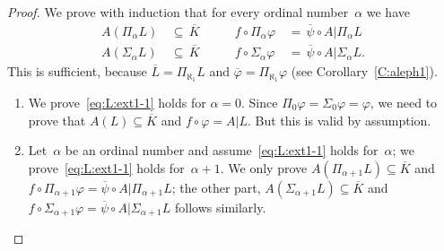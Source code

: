 \begin{proof}
We prove with induction that for every ordinal number~$\alpha$
we have 
\begin{equation}
\label{eq:L:ext1-1}
\begin{alignedat}{3}
A(\Pi_\alpha L)\,&\subseteq\, \overline{K}&
 \qquad f \circ \Pi_\alpha \varphi 
     \,&=\, \overline \psi \circ A | \Pi_\alpha L \\
A(\Sigma_\alpha L)\,&\subseteq\, \overline{K}&
 \qquad f \circ \Sigma_\alpha \varphi 
     \,&=\, \overline \psi \circ A | \Sigma_\alpha L. 
\end{alignedat}
\end{equation}
This is sufficient, because
$\overline{L}=\Pi_{\aleph_1} L$ and 
 $\overline \varphi = \Pi_{\aleph_1} \varphi$
(see Corollary~\ref{C:aleph1}).

\begin{enumerate}
\item We prove~\eqref{eq:L:ext1-1}
holds for $\alpha=0$.
Since $\Pi_0\varphi = \Sigma_0\varphi = \varphi$,
we need to prove that
$A(L)\subseteq \overline{K}$
and $f\circ \varphi = A| L$.
But this is valid by assumption.

\item
Let~$\alpha$ be an ordinal number
and assume~\eqref{eq:L:ext1-1}
holds for~$\alpha$;
we prove~\eqref{eq:L:ext1-1} holds for~$\alpha+1$.
We  only prove $A(\Pi_{\alpha+1} L) \subseteq \overline{K}$
and $f\circ \Pi_{\alpha+1}\varphi = \overline \psi \circ A|\Pi_{\alpha+1} L$;
the other part, $A(\Sigma_{\alpha+1} L) \subseteq \overline{K}$
and $f\circ \Sigma_{\alpha+1}\varphi 
= \overline\psi \circ A|\Sigma_{\alpha+1}L$
follows similarly.


\end{enumerate}
\end{proof}
